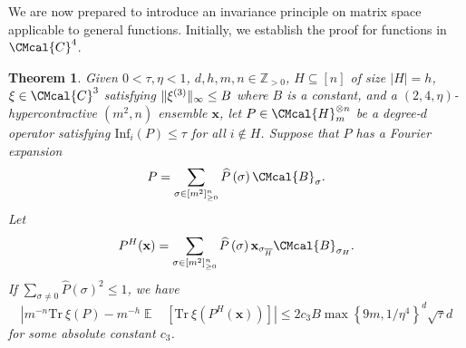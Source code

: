 \documentclass[10pt,a4paper]{article}
\def\B{\CMcal{B}}
\def\C{\CMcal{C}}
\def\H{\CMcal{H}}
\theoremstyle{plain}
\newtheorem{theorem}{Theorem}[section]
\theoremstyle{definition}
\newcommand {\minusspace} {\: \! \!}
\newcommand {\Fn} [2] {\ensuremath{ #1 \minusspace \Br{ #2 } }}
\newcommand {\set} [1] {\ensuremath{ \left\lbrace #1 \right\rbrace }}
\newcommand {\br} [1] {\ensuremath{ \left( #1 \right) }}
\newcommand {\Br} [1] {\ensuremath{ \left[ #1 \right] }}
\DeclarePairedDelimiter{\norm}{\lVert}{\rVert}
\newcommand {\ab} [1] {\ensuremath{ \left| #1 \right| }}
\DeclareMathOperator*{\bigE}{\mathbb{E}}
\newcommand {\expec} [2] {\Fn{\bigE_{\substack{#1}}}{#2}}
\newcommand {\Tr} {\ensuremath{ \mathrm{Tr} }}
\newcommand{\posint}{{\mathbb Z}_{>0}}
\newcommand{\randx}{\ensuremath{\mathbf{x}}}
\newcommand{\infi}[1]{\ensuremath{\mathrm{Inf}_i}\br{#1}}
\newcommand{\sigmarange}[1]{\ensuremath{\sigma\in[m^2]_{\geq0}^{#1}}}
\newcommand{\1}{\mathbb{1}} %
\begin{document}
We are now prepared to introduce an invariance principle on matrix space applicable to general functions. Initially, we establish the proof for functions in $\C^{4}$.
\begin{theorem}\label{lem:generalinvariance}
	Given $0<\tau,\eta<1$, $d,h,m,n\in\posint$, $H\subseteq[n]$ of size $\ab{H}=h$, $\xi\in\C^{3}$ satisfying $\norm{\xi^{(3)}}_\infty\leq B$ where $B$ is a constant, and a $(2,4,\eta)$-hypercontractive  $(m^2,n)$ ensemble $\randx$, let $P\in\H_m^{\otimes n}$ be a degree-$d$ operator satisfying $\infi{P}\leq\tau$ for all $i\notin H$. Suppose that $P$ has a Fourier expansion
	\[P=\sum_{\sigmarange{n}}\widehat{P}\br{\sigma}\B_\sigma.\]
	Let 
	\[P^H(\randx)=\sum_{\sigmarange{n}}\widehat{P}\br{\sigma}\randx_{\sigma_{\overline{H}}}\B_{\sigma_H}.\]
	If $\sum_{\sigma\ne0}\widehat{P}\br{\sigma}^2\leq1$, we have
	\[\ab{m^{-n}\Tr~\xi\br{P}-m^{-h}\expec{}{\Tr~\xi\br{P^H(\randx)}}}\leq 2c_3B \max\set{9m,1/\eta^4}^d\sqrt{\tau}d\]
	for some absolute constant $c_3$.
\end{theorem}
\end{document}
